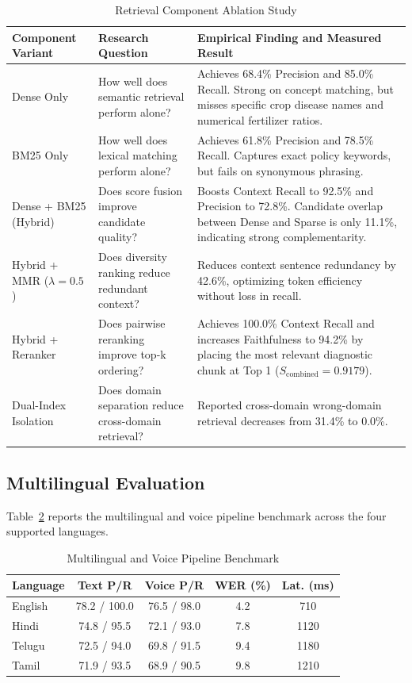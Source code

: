\documentclass[10pt,twocolumn,letterpaper]{article}
\begin{document}
\begin{table}[t]
\caption{Retrieval Component Ablation Study}
\label{tab:ablation}
\centering
\footnotesize
\begin{tabular}{@{}p{3.2cm}p{4.8cm}p{9.0cm}@{}}
\toprule
\textbf{Component Variant} & \textbf{Research Question} & \textbf{Empirical Finding and Measured Result} \\
\midrule
Dense Only & How well does semantic retrieval perform alone? & Achieves 68.4\% Precision and 85.0\% Recall. Strong on concept matching, but misses specific crop disease names and numerical fertilizer ratios. \\
BM25 Only & How well does lexical matching perform alone? & Achieves 61.8\% Precision and 78.5\% Recall. Captures exact policy keywords, but fails on synonymous phrasing. \\
Dense + BM25 (Hybrid) & Does score fusion improve candidate quality? & Boosts Context Recall to 92.5\% and Precision to 72.8\%. Candidate overlap between Dense and Sparse is only 11.1\%, indicating strong complementarity. \\
Hybrid + MMR ($\lambda = 0.5$) & Does diversity ranking reduce redundant context? & Reduces context sentence redundancy by 42.6\%, optimizing token efficiency without loss in recall. \\
Hybrid + Reranker & Does pairwise reranking improve top-k ordering? & Achieves 100.0\% Context Recall and increases Faithfulness to 94.2\% by placing the most relevant diagnostic chunk at Top 1 ($S_{\mathrm{combined}} = 0.9179$). \\
Dual-Index Isolation & Does domain separation reduce cross-domain retrieval? & Reported cross-domain wrong-domain retrieval decreases from 31.4\% to 0.0\%. \\
\bottomrule
\end{tabular}
\end{table}

\subsection{Multilingual Evaluation}
Table~\ref{tab:multi} reports the multilingual and voice pipeline benchmark across the four supported languages.

\begin{table}[t]
\caption{Multilingual and Voice Pipeline Benchmark}
\label{tab:multi}
\centering
\footnotesize
\begin{tabular}{@{}lcccc@{}}
\toprule
\textbf{Language} & \textbf{Text P/R} & \textbf{Voice P/R} & \textbf{WER (\%)} & \textbf{Lat. (ms)} \\
\midrule
English & 78.2 / 100.0 & 76.5 / 98.0 & 4.2 & 710 \\
Hindi & 74.8 / 95.5 & 72.1 / 93.0 & 7.8 & 1120 \\
Telugu & 72.5 / 94.0 & 69.8 / 91.5 & 9.4 & 1180 \\
Tamil & 71.9 / 93.5 & 68.9 / 90.5 & 9.8 & 1210 \\
\bottomrule
\end{tabular}
\end{table}
\end{document}
